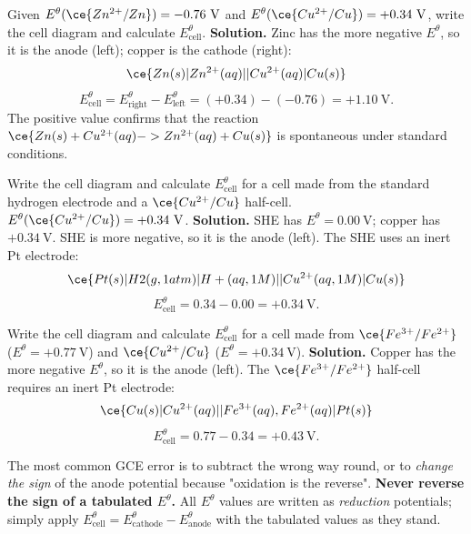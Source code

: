 \documentclass[11pt]{article}
\begin{document}
\begin{exoresolu}
Given $E^\theta(\ce{Zn^{2+}/Zn}) = -0.76\ \mathrm{V}$ and $E^\theta(\ce{Cu^{2+}/Cu}) = +0.34\ \mathrm{V}$, write the cell diagram and calculate $E^\theta_{\text{cell}}$.
\tcblower
\textbf{Solution.} Zinc has the more negative $E^\theta$, so it is the anode (left); copper is the cathode (right):
\[
\ce{Zn(s)|Zn^{2+}(aq)||Cu^{2+}(aq)|Cu(s)}
\]
\[
E^\theta_{\text{cell}} = E^\theta_{\text{right}} - E^\theta_{\text{left}} = (+0.34) - (-0.76) = +1.10\ \mathrm{V}.
\]
The positive value confirms that the reaction $\ce{Zn(s) + Cu^{2+}(aq) -> Zn^{2+}(aq) + Cu(s)}$ is spontaneous under standard conditions.
\end{exoresolu}

\begin{exoresolu}
Write the cell diagram and calculate $E^\theta_{\text{cell}}$ for a cell made from the standard hydrogen electrode and a $\ce{Cu^{2+}/Cu}$ half-cell. $E^\theta(\ce{Cu^{2+}/Cu}) = +0.34\ \mathrm{V}$.
\tcblower
\textbf{Solution.} SHE has $E^\theta = 0.00\ \mathrm{V}$; copper has $+0.34\ \mathrm{V}$. SHE is more negative, so it is the anode (left). The SHE uses an inert Pt electrode:
\[
\ce{Pt(s)|H2(g, 1 atm)|H+(aq, 1 M)||Cu^{2+}(aq, 1 M)|Cu(s)}
\]
\[
E^\theta_{\text{cell}} = 0.34 - 0.00 = +0.34\ \mathrm{V}.
\]
\end{exoresolu}

\begin{exoresolu}
Write the cell diagram and calculate $E^\theta_{\text{cell}}$ for a cell made from $\ce{Fe^{3+}/Fe^{2+}}$ ($E^\theta = +0.77\ \mathrm{V}$) and $\ce{Cu^{2+}/Cu}$ ($E^\theta = +0.34\ \mathrm{V}$).
\tcblower
\textbf{Solution.} Copper has the more negative $E^\theta$, so it is the anode (left). The $\ce{Fe^{3+}/Fe^{2+}}$ half-cell requires an inert Pt electrode:
\[
\ce{Cu(s)|Cu^{2+}(aq)||Fe^{3+}(aq),Fe^{2+}(aq)|Pt(s)}
\]
\[
E^\theta_{\text{cell}} = 0.77 - 0.34 = +0.43\ \mathrm{V}.
\]
\end{exoresolu}

\begin{attention}
The most common GCE error is to subtract the wrong way round, or to \emph{change the sign} of the anode potential because "oxidation is the reverse". \textbf{Never reverse the sign of a tabulated $E^\theta$.} All $E^\theta$ values are written as \emph{reduction} potentials; simply apply $E^\theta_{\text{cell}} = E^\theta_{\text{cathode}} - E^\theta_{\text{anode}}$ with the tabulated values as they stand.
\end{attention}
\end{document}
